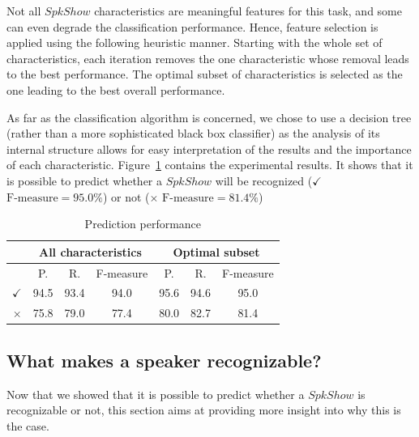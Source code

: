 Not all $SpkShow$ characteristics are meaningful features for this task, and some can even degrade the classification performance. 
Hence, feature selection is applied using the following heuristic manner.
Starting with the whole set of characteristics, each iteration removes the one characteristic whose removal leads to the best performance.
The optimal subset of characteristics is selected as the one leading to the best overall performance.

As far as the classification algorithm is concerned, we chose to use a decision tree (rather than a more sophisticated black box classifier) as the analysis of its internal structure allows for easy interpretation of the results and the importance of each characteristic.
Figure~\ref{tableresult} contains the experimental results. It shows that it is possible to predict whether a $SpkShow$ will be recognized ($\checkmark$ $\text{F-measure} = 95.0\%$) or not ($\times$ $\text{F-measure} = 81.4\%$)
\begin{table}[t]
\begin{center}
\begin{tabular}{|r|c|c|c|c|c|c|}
\hline
& \multicolumn{3}{c|}{All characteristics} & \multicolumn{3}{c|}{Optimal subset} \\
\hline
& P. & R. & F-measure & P. & R. & F-measure \\
\hline
$\checkmark$ & 94.5 & 93.4 & 94.0 & 95.6 & 94.6 & 95.0 \\
\hline
$\times$ & 75.8 & 79.0 & 77.4 & 80.0 & 82.7 & 81.4 \\
\hline
\end{tabular}
\caption{Prediction performance}
\label{tableresult}
\end{center}
\end{table}

\subsection{What makes a speaker recognizable?}

Now that we showed that it is possible to predict whether a $SpkShow$ is recognizable or not, this section aims at providing more insight into why this is the case.

